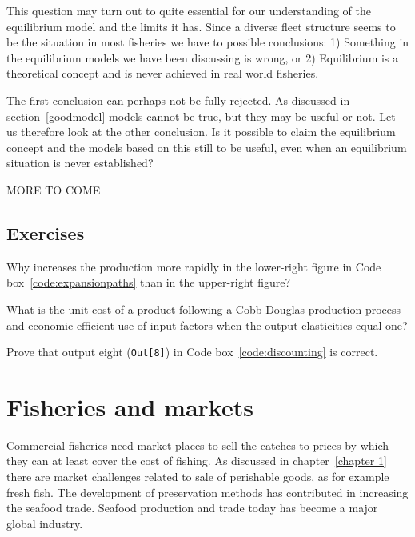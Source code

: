\documentclass[11pt,fleqn]{book} %
\begin{document}
This question may turn out to quite essential for our understanding of the equilibrium model and the limits it has. Since a diverse fleet structure seems to be the situation in most fisheries we have to possible conclusions: 1) Something in the equilibrium models we have been discussing is wrong, or 2) Equilibrium is a theoretical concept and is never achieved in real world fisheries.

The first conclusion can perhaps not be fully rejected. As discussed in section~\ref{goodmodel} models cannot be true, but they may be useful or not. Let us therefore look at the other conclusion. Is it possible to claim the equilibrium concept and the models based on this still to be useful, even when an equilibrium situation is never established?

MORE TO COME

\section*{Exercises}

\begin{exercise}
Why increases the production more rapidly in the lower-right figure in Code box~\ref{code:expansionpaths} than in the upper-right figure?
\end{exercise}
\begin{exercise}
What is the unit cost of a product following a Cobb-Douglas production process and economic efficient use of input factors when the output elasticities equal one?
\end{exercise}
\begin{exercise}
Prove that output eight (\texttt{Out[8]}) in Code box~\ref{code:discounting} is correct.
\end{exercise}



\chapter{Fisheries and markets} \label{chapter 7}

Commercial fisheries need market places to sell the catches to prices by which they can at least cover the cost of fishing. As discussed in chapter~\ref{chapter 1} there are market challenges related to sale of perishable goods, as for example fresh fish. The development of preservation methods has contributed in increasing the seafood trade. Seafood production and trade today has become a major global industry.
\end{document}

